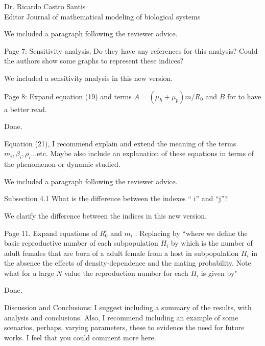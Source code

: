 \documentclass [12pt]{letter}
\begin{document}
\begin{letter}{Dr. Ricardo Castro Santis\\ Editor Journal of mathematical modeling of biological systems}
\begin{enumerate}
	We included a paragraph following the reviewer advice.
	
	\item Page 7: Sensitivity analysis, Do they have any references for this analysis? Could
	the authors show some graphs to represent these indices?
	
	We included a sensitivity analysis in this new version.
	
	\item Page 8: Expand equation (19) and terms $A=(\mu_h + \mu_p)m/R_0$ and $B$ for to have a
	better read.
	
	Done.
	
	\item Equation (21), I recommend explain and extend the meaning of the terms $m_i, \beta_i,
	\rho_i$...etc. Maybe also include an explanation of these equations in terms of the
	phenomenon or dynamic studied.
	
	We included a paragraph following the reviewer advice.
	
	\item Subsection 4.1 What is the difference between the indexes “ i” and “j”?
	
	We clarify the difference between the indices in this new version.
	
	
	\item Page 11. Expand equations of $R_0^i$ and $m_i$ . Replacing by
	“where we define the basic reproductive number of each subpopulation $H_i$ by
	which is the number of adult females that are born of a adult female from a host in
	subpopulation $H_i$ in the absence the effects of density-dependence and the mating
	probability. Note what for a large $N$ value the reproduction number for each $H_i$ is
	given by"
	
	Done.
	
	{\color{red}
	\item Discussion and Conclusions: I suggest including a summary of the results, with
	analysis and conclusions. Also, I recommend including an example of some
	scenarios, perhaps, varying parameters, these to evidence the need for future
	works. I feel that you could comment more here.
	}
	
	
	
\end{enumerate}


\end{letter}
\end{document}

